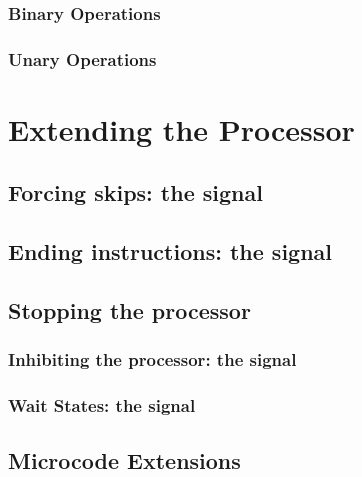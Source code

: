 \subsection{Binary Operations}



\subsection{Unary Operations}






\chapter{Extending the Processor}



\section{Forcing skips: the  signal}



\section{Ending instructions: the  signal}



\section{Stopping the processor}



\subsection{Inhibiting the processor: the  signal}



\subsection{Wait States: the  signal}



\section{Microcode Extensions}

